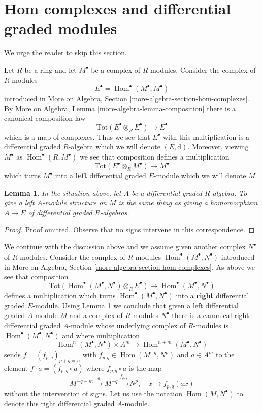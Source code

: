 \documentclass{stacks-project}
\theoremstyle{plain}
\newtheorem{lemma}[subsection]{Lemma}
\theoremstyle{definition}
\theoremstyle{remark}
\numberwithin{equation}{subsection}
\def\Hom{\mathop{\mathrm{Hom}}\nolimits}
\begin{document}
\section{Hom complexes and differential graded modules}
\label{section-hom-complexes}

\noindent
We urge the reader to skip this section.

\medskip\noindent
Let $R$ be a ring and let $M^\bullet$ be a complex of $R$-modules.
Consider the complex of $R$-modules
$$
E^\bullet = \Hom^\bullet(M^\bullet, M^\bullet)
$$
introduced in
More on Algebra, Section \ref{more-algebra-section-hom-complexes}.
By More on Algebra, Lemma \ref{more-algebra-lemma-composition}
there is a canonical composition law
$$
\text{Tot}(E^\bullet \otimes_R E^\bullet) \to E^\bullet
$$
which is a map of complexes. Thus we see that $E^\bullet$ with this
multiplication is a differential graded $R$-algebra which we will
denote $(E, \text{d})$. Moreover, viewing $M^\bullet$ as
$\Hom^\bullet(R, M^\bullet)$ we see that composition defines a multiplication
$$
\text{Tot}(E^\bullet \otimes_R M^\bullet) \to M^\bullet
$$
which turns $M^\bullet$ into a {\bf left} differential graded $E$-module
which we will denote $M$.

\begin{lemma}
\label{lemma-left-module-structure}
In the situation above, let $A$ be a differential graded $R$-algebra.
To give a left $A$-module structure on $M$ is the same thing as
giving a homomorphism $A \to E$ of differential graded $R$-algebras.
\end{lemma}

\begin{proof}
Proof omitted. Observe that no signs intervene in this correspondence.
\end{proof}

\noindent
We continue with the discussion above and we assume given another
complex $N^\bullet$ of $R$-modules. Consider the complex
of $R$-modules $\Hom^\bullet(M^\bullet, N^\bullet)$ introduced in
More on Algebra, Section \ref{more-algebra-section-hom-complexes}.
As above we see that composition
$$
\text{Tot}(\Hom^\bullet(M^\bullet, N^\bullet) \otimes_R E^\bullet)
\to \Hom^\bullet(M^\bullet, N^\bullet)
$$
defines a multiplication which turns $\Hom^\bullet(M^\bullet, N^\bullet)$
into a {\bf right} differential graded $E$-module. Using
Lemma \ref{lemma-left-module-structure} we
conclude that given a left differential graded $A$-module $M$ and
a complex of $R$-modules $N^\bullet$ there is a canonical
right differential graded $A$-module whose underlying complex
of $R$-modules is $\Hom^\bullet(M^\bullet, N^\bullet)$ and
where multiplication
$$
\Hom^n(M^\bullet, N^\bullet) \times A^m \longrightarrow
\Hom^{n + m}(M^\bullet, N^\bullet)
$$
sends $f = (f_{p, q})_{p + q = n}$ with $f_{p, q} \in \Hom(M^{-q}, N^p)$
and $a \in A^m$ to the element $f \cdot a = (f_{p, q} \circ a)$ where
$f_{p, q} \circ a$ is the map
$$
M^{-q - m} \xrightarrow{a} M^{-q} \xrightarrow{f_{p, q}} N^p, \quad
x \longmapsto f_{p, q}(ax)
$$
without the intervention of signs. Let us use the notation
$\Hom(M, N^\bullet)$ to denote this right differential graded $A$-module.
\end{document}
